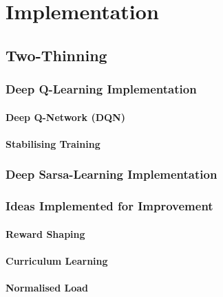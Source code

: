 \chapter{Implementation}\label{implementation}

\ifpdf
    \graphicspath{{Chapter3/Figs/Raster/}{Chapter3/Figs/PDF/}{Chapter3/Figs/}}
\else
    \graphicspath{{Chapter3/Figs/Vector/}{Chapter3/Figs/}}
\fi


\section{Two-Thinning}


\subsection{Deep Q-Learning Implementation}


\subsubsection{Deep Q-Network (DQN)}


\subsubsection{Stabilising Training}


\subsection{Deep Sarsa-Learning Implementation}


\subsection{Ideas Implemented for Improvement} \label{improvementideas}


\subsubsection{Reward Shaping}


\subsubsection{Curriculum Learning}


\subsubsection{Normalised Load}


